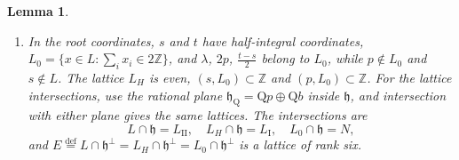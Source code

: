 \documentclass[leqno]{article}
\newcommand{\Q}{\mathrm{Q}}
\newcommand{\Z}{\ensuremath{\mathbb{Z}}}
\newcommand{\ov}{\overset}
\newtheorem{lemma}[thm]{Lemma}
\numberwithin{equation}{section}
\begin{document}
\begin{lemma}
\begin{enumerate}
\item In the root coordinates, $s$ and $t$ have half-integral coordinates, $L_0 = \{x \in L : \sum_i x_i \in 2\Z\}$, and $\lambda$, $2p$, $\frac{t-s}2$ belong to $L_0$, while $p \notin L_0$ and $s \notin L$. The lattice $L_H$ is even, $(s,L_0) \subset \Z$ and $(p,L_0) \subset \Z$. For the lattice intersections, use the rational plane $\mathfrak h_{\Q} = \Q p\oplus\Q b$ inside $\mathfrak h$, and intersection with either plane gives the same lattices. The intersections are
\begin{equation}
\label{eq:intersections}
L \cap \mathfrak h = L_{\mathrm{II}},
\quad
L_H \cap \mathfrak h = L_{\mathrm I},
\quad
L_0 \cap \mathfrak h = N,
\end{equation}
and $E \ov{\mathrm{def}}{=} L \cap \mathfrak h^\perp = L_H \cap \mathfrak h^\perp = L_0 \cap \mathfrak h^\perp$ is a lattice of rank six.
\end{enumerate}
\end{lemma}
\end{document}

